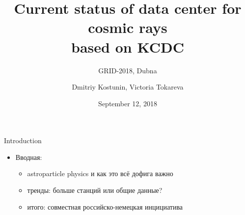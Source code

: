\documentclass[18pt]{beamer}
\title[Cosmic rays data center]{Current status of data center for cosmic rays \\based on KCDC}
\subtitle{GRID-2018, Dubna}
\author{Dmitriy Kostunin, Victoria Tokareva}
\institute{Institute for Nuclear Physics (IKP)}
\date{September 12, 2018}
\begin{document}

\begin{frame}
\titlepage
\end{frame}

\begin{frame}{Introduction}
\begin{itemize}
  \item Вводная:
  \begin{itemize}
    \item astroparticle physics и как это всё дофига важно
    \item тренды: больше станций или общие данные?
    \item итого: совместная российско-немецкая инцициатива
  \end{itemize}
\end{itemize}
\end{frame}
\end{document}
